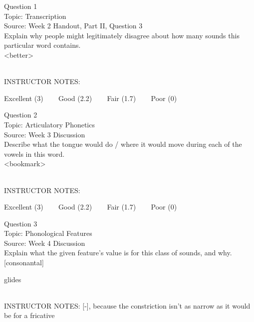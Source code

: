 \documentclass[12pt]{article}
\begin{document}
\begin{center}
\textbf{{\color{blue}{\HUGE START OF EXAM\\}}}

\textbf{{\color{blue}{\HUGE Student ID: 17487\\}}}

\textbf{{\color{blue}{\HUGE \\}}}

\end{center}
\newpage

{\large Question 1}\\

Topic: Transcription\\
Source: Week 2 Handout, Part II, Question 3\\

Explain why people might legitimately disagree about how many sounds this particular word contains.\\

<better>


~\\
INSTRUCTOR NOTES: 


\vfill
Excellent (3) ~~~ Good (2.2) ~~~ Fair (1.7) ~~~ Poor (0)
\newpage

{\large Question 2}\\

Topic: Articulatory Phonetics\\
Source: Week 3 Discussion\\

Describe what the tongue would do / where it would move during each of the vowels in this word.\\

<bookmark>


~\\
INSTRUCTOR NOTES: 


\vfill
Excellent (3) ~~~ Good (2.2) ~~~ Fair (1.7) ~~~ Poor (0)
\newpage

{\large Question 3}\\

Topic: Phonological Features\\
Source: Week 4 Discussion\\

Explain what the given feature’s value is for this class of sounds, and why.\\

{[consonantal]}

glides


~\\
INSTRUCTOR NOTES: [-], because the constriction isn't as narrow as it would be for a fricative
\end{document}
